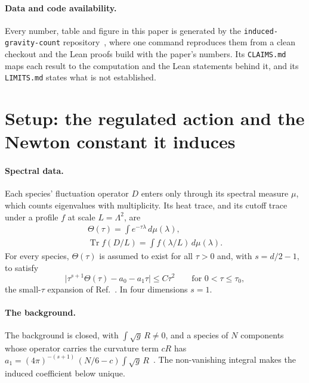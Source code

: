 \documentclass[aps,prd,reprint,amsmath,amssymb,superscriptaddress,nofootinbib]{revtex4-2}
\begin{document}
\paragraph{Data and code availability.}
Every number, table and figure in this paper is generated by the
\texttt{induced-gravity-count} repository~\cite{SwansonIGC}, where one command reproduces them from a
clean checkout and the Lean proofs build with the paper's numbers. Its
\texttt{CLAIMS.md} maps each result to the computation and the Lean statements behind
it, and its \texttt{LIMITS.md} states what is not established.

\appendix

\section{Setup: the regulated action and the Newton constant it induces}
\label{app:setup}

\paragraph{Spectral data.}
Each species' fluctuation operator $D$ enters only through its spectral measure $\mu$,
which counts eigenvalues with multiplicity. Its heat trace, and its cutoff trace under a
profile $f$ at scale $L=\Lambda^2$, are
\begin{equation}
\begin{gathered}
  \Theta(\tau)=\int e^{-\tau\lambda}\,d\mu(\lambda),\\
  \operatorname{Tr} f(D/L)=\int f(\lambda/L)\,d\mu(\lambda).
\end{gathered}
\end{equation}
For every species, $\Theta(\tau)$ is assumed to exist for all $\tau>0$ and, with
$s=d/2-1$, to satisfy
\begin{equation}\label{eq:heatbound}
  \bigl|\tau^{s+1}\Theta(\tau)-a_0-a_1\tau\bigr|\le C\tau^2\qquad\text{for } 0<\tau\le\tau_0,
\end{equation}
the small-$\tau$ expansion of Ref.~\cite{Vassilevich2003}. In four dimensions $s=1$.

\paragraph{The background.}
The background is closed, with $\int\!\sqrt g\,R\neq0$, and a species of $N$ components
whose operator carries the curvature term $cR$ has
$a_1=(4\pi)^{-(s+1)}\,(N/6-c)\int\!\sqrt g\,R$~\cite{Vassilevich2003,BirrellDavies1982}.
The non-vanishing integral makes the induced coefficient below unique.
\end{document}
